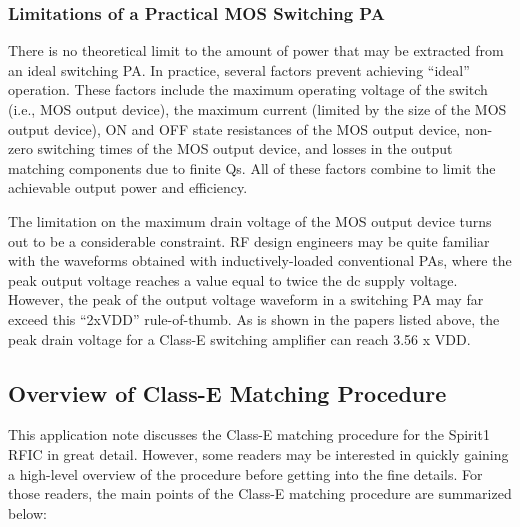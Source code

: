       \subsubsection{Limitations of a Practical MOS Switching PA}
        There is no theoretical limit to the amount of power that may be extracted from an ideal switching 
        PA. In practice, several factors prevent achieving “ideal” operation. These factors include the 
        maximum operating voltage of the switch (i.e., MOS output device), the maximum current (limited by 
        the size of the MOS output device), ON and OFF state resistances of the MOS output device, non-zero 
        switching times of the MOS output device, and losses in the output matching components due to 
        finite Qs. All of these factors combine to limit the achievable output power and efficiency.
        
        The limitation on the maximum drain voltage of the MOS output device turns out to be a considerable 
        constraint. RF design engineers may be quite familiar with the waveforms obtained with 
        inductively-loaded conventional PAs, where the peak output voltage reaches a value equal to twice 
        the dc supply voltage. However, the peak of the output voltage waveform in a switching PA may far 
        exceed this “2xVDD” rule-of-thumb. As is shown in the papers listed above, the peak drain voltage 
        for a Class-E switching amplifier can reach 3.56 x VDD.

    \subsection{Overview of Class-E Matching Procedure}
      This application note discusses the Class-E matching procedure for the Spirit1 RFIC in great detail. 
      However, some readers may be interested in quickly gaining a high-level overview of the procedure 
      before getting into the fine details. For those readers, the main points of the Class-E matching 
      procedure are summarized below:
      
